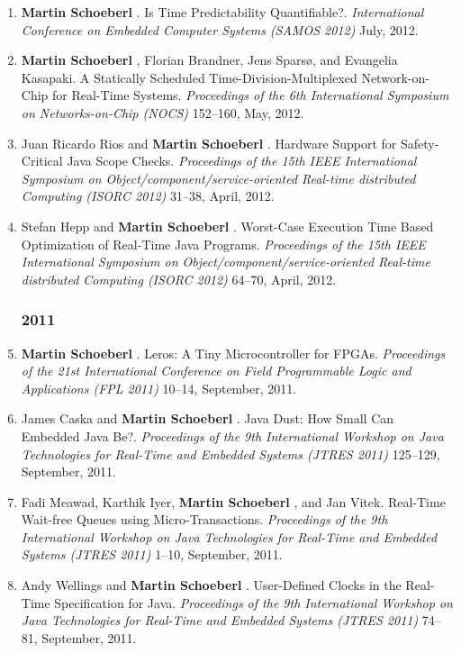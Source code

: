 \begin{enumerate}
\item {\bf Martin Schoeberl }.
 Is Time Predictability Quantifiable?.
 \emph{International Conference on Embedded Computer Systems (SAMOS 2012)} July, 2012.

\item {\bf Martin Schoeberl }, Florian Brandner, Jens Spars{\o}, and Evangelia Kasapaki.
 A Statically Scheduled Time-Division-Multiplexed Network-on-Chip for Real-Time Systems.
 \emph{Proceedings of the 6th International Symposium on Networks-on-Chip (NOCS)} 152--160, May, 2012.

\item Juan Ricardo Rios and {\bf Martin Schoeberl }.
 Hardware Support for Safety-Critical Java Scope Checks.
 \emph{Proceedings of the 15th IEEE International Symposium on Object/component/service-oriented Real-time distributed Computing (ISORC 2012)} 31--38, April, 2012.

\item Stefan Hepp and {\bf Martin Schoeberl }.
 Worst-Case Execution Time Based Optimization of Real-Time Java Programs.
 \emph{Proceedings of the 15th IEEE International Symposium on Object/component/service-oriented Real-time distributed Computing (ISORC 2012)} 64--70, April, 2012.


\subsubsection*{2011}

\item {\bf Martin Schoeberl }.
 Leros: A Tiny Microcontroller for FPGAs.
 \emph{Proceedings of the 21st International Conference on Field Programmable Logic and Applications (FPL 2011)} 10--14, September, 2011.

\item James Caska and {\bf Martin Schoeberl }.
 Java Dust: How Small Can Embedded Java Be?.
 \emph{Proceedings of the 9th International Workshop on Java Technologies for Real-Time and Embedded Systems (JTRES 2011)} 125--129, September, 2011.

\item Fadi Meawad, Karthik Iyer, {\bf Martin Schoeberl }, and Jan Vitek.
 Real-Time Wait-free Queues using Micro-Transactions.
 \emph{Proceedings of the 9th International Workshop on Java Technologies for Real-Time and Embedded Systems (JTRES 2011)} 1--10, September, 2011.

\item Andy Wellings and {\bf Martin Schoeberl }.
 User-Defined Clocks in the Real-Time Specification for Java.
 \emph{Proceedings of the 9th International Workshop on Java Technologies for Real-Time and Embedded Systems (JTRES 2011)} 74--81, September, 2011.


\end{enumerate}

